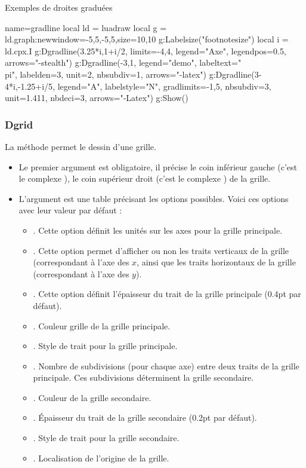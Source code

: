 \begin{demo}{Exemples de droites graduées}
\begin{luadraw}{name=gradline}
local ld = luadraw
local g = ld.graph:new{window={-5,5,-5,5},size={10,10}}
g:Labelsize("footnotesize")
local i = ld.cpx.I
g:Dgradline({3.25*i,1+i/2}, {limits={-4,4}, legend="Axe", legendpos=0.5, arrows="-stealth"})
g:Dgradline({-3,1}, {legend="demo", labeltext="\\pi", labelden=3, unit=2, nbsubdiv=1, arrows="-latex"})
g:Dgradline({3-4*i,-1.25+i/5}, {legend="A", labelstyle="N", gradlimits={-1,5},
nbsubdiv=3, unit=1.411, nbdeci=3, arrows="-Latex"})
g:Show()
\end{luadraw}
\end{demo}

\subsubsection{Dgrid}

La méthode  permet le dessin d'une grille.
\begin{itemize}
    \item Le premier argument est obligatoire, il précise le coin inférieur gauche (c'est le complexe ), le coin supérieur droit (c'est le complexe ) de la grille.
    \item L'argument  est une table précisant les options possibles. Voici ces options avec leur valeur par défaut :
        \begin{itemize}
            \item {}. Cette option définit les unités sur les axes pour la grille principale.
            \item {}. Cette option permet d'afficher ou non les traits verticaux de la grille (correspondant à l'axe des $x$, ainsi que les traits horizontaux de la grille (correspondant à l'axe des $y$).
            \item {}. Cette option définit l'épaisseur du trait de la grille principale (0.4pt par défaut).
            \item {}. Couleur grille de la grille principale.
            \item {}. Style de trait pour la grille principale.
            \item {}. Nombre de subdivisions (pour chaque axe) entre deux traits de la grille principale. Ces subdivisions déterminent la grille secondaire.
            \item {}. Couleur de la grille secondaire.
            \item {}. Épaisseur du trait de la grille secondaire (0.2pt par défaut).
            \item {}. Style de trait pour la grille secondaire.
            \item {}. Localisation de l'origine de la grille.
        \end{itemize}
\end{itemize}

